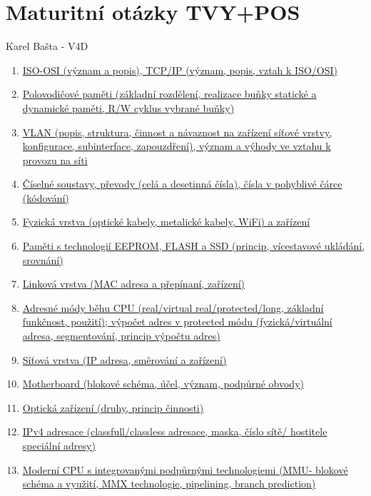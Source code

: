 \documentclass[a4paper,11pt]{article}
\begin{document}

\section*{Maturitní otázky TVY+POS}
\begin{center}
  \Large Karel Bašta - V4D
\end{center}
\begin{enumerate}
  \item \hyperref[sec:isoosi]{ISO-OSI (význam a popis), TCP/IP (význam, popis, vztah k ISO/OSI)}
  \item \hyperref[sec:polpameti]{Polovodičové paměti (základní rozdělení, realizace buňky statické a dynamické paměti, R/W cyklus vybrané buňky)}
  \item \hyperref[sec:vlan]{VLAN (popis, struktura, činnost a návaznost na zařízení síťové vrstvy, konfigurace, subinterface, zapouzdření), význam a výhody ve vztahu k provozu na síti}
  \item \hyperref[sec:ciselnesoustavy]{Číselné soustavy, převody (celá a desetinná čísla), čísla v pohyblivé čárce (kódování)}
  \item \hyperref[sec:fyzicka-vrstva]{Fyzická vrstva (optické kabely, metalické kabely, WiFi) a zařízení}
  \item \hyperref[sec:eeprom-flash-ssd]{Paměti s technologií EEPROM, FLASH a SSD (princip, vícestavové ukládání, srovnání)}
  \item \hyperref[sec:linkova-vrstva]{Linková vrstva (MAC adresa a přepínaní, zařízení)}
  \item \hyperref[sec:adresnemody]{Adresné módy běhu CPU (real/virtual real/protected/long, základní funkčnost, použití); výpočet adres v protected módu (fyzická/virtuální adresa, segmentování, princip výpočtu adres)}
  \item \hyperref[sec:sitova-vrstva]{Síťová vrstva (IP adresa, směrování a zařízení)}
  \item \hyperref[sec:motherboard]{Motherboard (blokové schéma, účel, význam, podpůrné obvody)}
  \item \hyperref[sec:opticka-zarizeni]{Optická zařízení (druhy, princip činnosti)}
  \item \hyperref[sec:ipv4-adresace]{IPv4 adresace (classfull/classless adresace, maska, číslo sítě/ hostitele speciální adresy)}
  \item \hyperref[sec:moderni-cpu]{Moderní CPU s integrovanými podpůrnými technologiemi (MMU- blokové schéma a využití, MMX technologie, pipelining, branch prediction)}

\end{enumerate}
\end{document}
